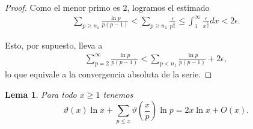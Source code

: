 \documentclass[10pt]{article}
\newtheorem{lemma}[theorem]{Lema}
\theoremstyle{definition}
\theoremstyle{remark}
\begin{document}
\begin{proof}
Como el menor primo es 2, logramos el estimado 
\begin{align}
\sum_{p \geq n_1} \frac{\ln p}{p (p - 1)} <  \sum_{p \geq n_1} \frac{\epsilon}{p^\frac{3}{2}} \le \int_{1}^\infty \frac{\epsilon}{x^\frac{3}{2}} dx  < 2 \epsilon. 
\end{align}

Esto, por supuesto, lleva a 
\begin{align}
\sum_{p = 2}^\infty \frac{\ln p}{p (p - 1)} < \sum_{p < n_1} \frac{\ln p}{p (p - 1)} + 2 \epsilon, 
\end{align}
lo que equivale a la convergencia absoluta de la serie. 
\end{proof}

\begin{lemma}\label{lem20}
Para todo $x \geq 1$ tenemos
\[
\vartheta(x)\ln x + \sum_{p \leq x} \vartheta\left(\frac{x}{p}\right)\ln p = 2x\ln x + O(x).
\]
\end{lemma}
\end{document}

